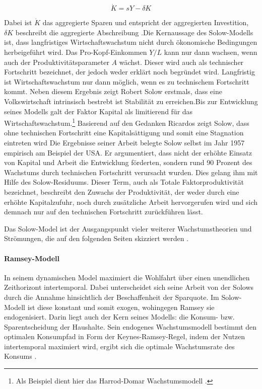 	\begin{equation}
		\dot{K}=sY-\delta K
	\end{equation}\label{Bewegungsgesetz Solow}

Dabei ist $\dot{K}$ das aggregierte Sparen und entspricht der aggregierten Investition, $\delta K$ beschreibt die aggregierte Abschreibung \citep{Solow.1956}.\newline Die Kernaussage des Solow-Modells ist, dass langfristiges Wirtschaftswachstum nicht durch {\"o}konomische Bedingungen herbeigef{\"u}hrt wird. Das Pro-Kopf-Einkommen ${Y}/{L}$ kann nur dann wachsen, wenn auch der Produktivitätsparameter $A$ w{\"a}chst. Dieser wird auch als technischer Fortschritt bezeichnet, der jedoch weder erkl{\"a}rt noch begr{\"u}ndet wird. Langfristig ist Wirtschaftswachstum nur dann m{\"o}glich, wenn es zu technischem Fortschritt kommt. Neben diesem Ergebnis zeigt Robert Solow erstmals, dass eine Volkswirtschaft intrinsisch bestrebt ist Stabilit{\"a}t zu erreichen.\newline Bis zur Entwicklung seines Modells galt der Faktor Kapital als limitierend f{\"u}r das Wirtschaftswachstum.\footnote{Als Beispiel dient hier das Harrod-Domar Wachstumsmodell \citep{Harrod.1939,Domar.1946}.} Basierend auf den Gedanken Ricardos zeigt Solow, dass ohne technischen Fortschritt eine Kapitals{\"a}ttigung und somit eine Stagnation eintreten wird \citep{Solow.1956} \newline Die Ergebnisse seiner Arbeit belegte Solow selbst im Jahr 1957 empirisch am Beispiel der USA. Er argumentiert, dass nicht der erh{\"o}hte Einsatz von Kapital und Arbeit die Entwicklung f{\"o}rderten, sondern rund 90 Prozent des Wachstums durch technischen Fortschritt verursacht wurden. Dies gelang ihm mit Hilfe des Solow-Residuums. Dieser Term, auch als Totale Faktorproduktivit{\"a}t bezeichnet, beschreibt den Zuwachs der Produktivit{\"a}t, der weder durch eine erh{\"o}hte Kapitalzufuhr, noch durch zus{\"a}tzliche Arbeit hervorgerufen wird und sich demnach nur auf den technischen Fortschritt zur{\"u}ckf{\"u}hren l{\"a}sst.\newline 


Das Solow-Model ist der Ausgangspunkt vieler weiterer Wachstumstheorien und Str{\"o}mungen, die auf den folgenden Seiten skizziert werden \citep{Aghion.2015}.


\paragraph{Ramsey-Modell}
In seinem dynamischen Model maximiert \citet{Ramsey.1928} die Wohlfahrt {\"u}ber einen unendlichen Zeithorizont intertemporal. Dabei unterscheidet sich seine Arbeit von der Solows durch die Annahme hinsichtlich der Beschaffenheit der Sparquote. Im Solow-Modell ist diese konstant und somit exogen, wohingegen Ramsey sie endogenisiert. Darin liegt auch der Kern seines Modells: die Konsum- bzw. Sparentscheidung der Haushalte. Sein endogenes Wachstumsmodell bestimmt den optimalen Konsumpfad in Form der Keynes-Ramsey-Regel, indem der Nutzen intertemporal maximiert wird, ergibt sich die optimale Wachstumsrate des Konsums \cite{Ramsey.1928}.
\bigskip


